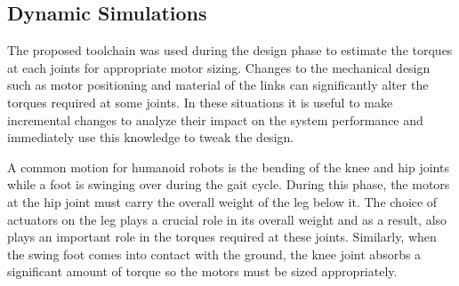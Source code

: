 \subsection{Dynamic Simulations} %
\label{sub:dynamic_simulations}

The proposed toolchain was used during the design phase to estimate the torques at each joints for appropriate motor sizing. Changes to the mechanical design such as motor positioning and material of the links can significantly alter the torques required at some joints. In these situations it is useful to make incremental changes to analyze their impact on the system performance and immediately use this knowledge to tweak the design.

A common motion for humanoid robots is the bending of the knee and hip joints while a foot is swinging over during the gait cycle. During this phase, the motors at the hip joint must carry the overall weight of the leg below it. The choice of actuators on the leg plays a crucial role in its overall weight and as a result, also plays an important role in the torques required at these joints. Similarly, when the swing foot comes into contact with the ground, the knee joint absorbs a significant amount of torque so the motors must be sized appropriately.

